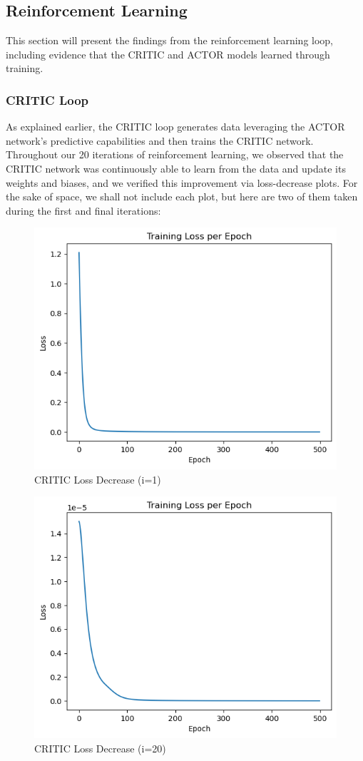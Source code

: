\documentclass[11pt]{article}
\begin{document}
\subsection{Reinforcement Learning}

This section will present the findings from the reinforcement learning loop, including evidence that the CRITIC and ACTOR models learned through training.

\subsubsection{CRITIC Loop}

As explained earlier, the CRITIC loop generates data leveraging the ACTOR network's predictive capabilities and then trains the CRITIC network. Throughout our 20 iterations of reinforcement learning, we observed that the CRITIC network was continuously able to learn from the data and update its weights and biases, and we verified this improvement via loss-decrease plots. For the sake of space, we shall not include each plot, but here are two of them taken during the first and final iterations:

\begin{figure}[H]
    \centering
    \includegraphics[width=0.4\linewidth]{criticloss.png}
    \caption{CRITIC Loss Decrease (i=1)}
\end{figure}

\begin{figure}[H]
    \centering
    \includegraphics[width=0.4\linewidth]{criticloss2.png}
    \caption{CRITIC Loss Decrease (i=20)}
\end{figure}
\end{document}
